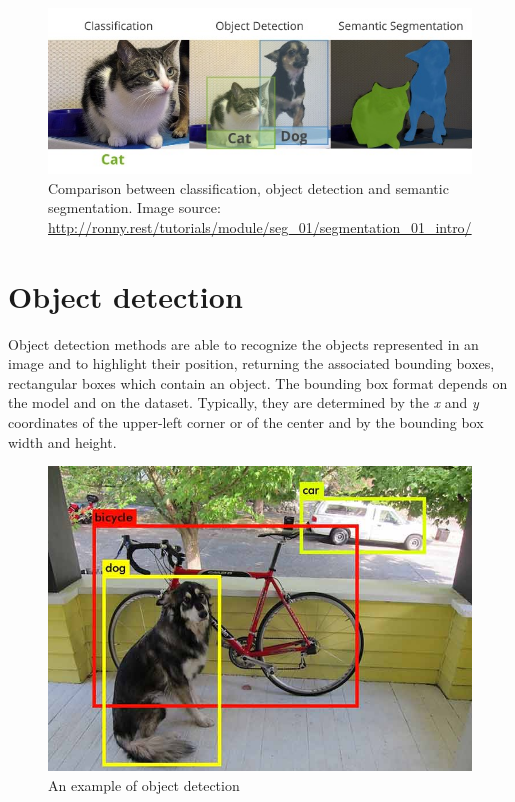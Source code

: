 \documentclass[%
    corpo=12pt,
    twoside,
    stile=classica,   
    tipotesi=magistrale,
    evenboxes,
    english,
	numerazioneromana,
]{toptesi}
\begin{document}
\begin{figure}
	\centering
	\includegraphics[width=.9\textwidth]{imgs/classification_detection_segmentaion.jpeg}
	\caption[Comparison between classification, object detection and semantic segmentation]{Comparison between classification, object detection and semantic segmentation. Image source: \url{http://ronny.rest/tutorials/module/seg_01/segmentation_01_intro/}}
	\label{fig:classdetseg}
\end{figure}

\section{Object detection}\label{sec:detection}
Object detection methods are able to recognize the objects represented in an image and to highlight their position, returning the associated bounding boxes, rectangular boxes which contain an object. The bounding box format depends on the model and on the dataset. Typically, they are determined by the \textit{x} and \textit{y} coordinates of the upper-left corner
or of the center
and by the bounding box width and height.

\begin{figure}[ht]
	\centering
	\includegraphics[width=.7\textwidth]{imgs/yolo_detection.png}
	\caption{An example of object detection\cite{redmon2016look}}
\end{figure}
\end{document}
